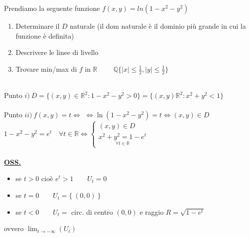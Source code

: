 \documentclass[a4paper, oneside]{article}
\begin{document}
                \begin{example}
                    Prendiamo la seguente funzione
                    $f(x,y) = ln(1-x^2-y^2)$
            \begin{enumerate}[$i)$]
                \item Determinare il $D$ naturale (il dom naturale è il dominio più grande in cui la funzione è definita)
                \item Descrivere le linee di livello
                \item Trovare min/max di $f$ in $\mathbb{R}$ $\qquad \mathbb{Q} \{ |x| \leq \frac{1}{2} , |y| \leq  \frac{1}{2}\}$
            \end{enumerate}

            \hfil\\
            Punto $i) \ D=\{(x,y) \in \mathbb{R}^2: 1-x^2-y^2 >0\} = \{(x,y) \mathbb{R}^2: x^2+y^2<1\}$\\
            \hfil\\
            Punto $ii) \ f(x,y) = t \Leftrightarrow$  $\Leftrightarrow \ln(1-x^2-y^2) = t \Leftrightarrow (x,y) \in D$\\
            $1-x^2-y^2 = e^t \quad \forall t \in \mathbb{R} \Leftrightarrow
            \begin{cases}
                (x,y) \in D\\
                \underset{\forall t \in \mathbb{R}}{x^2+y^2=1-e^t}
            \end{cases}$\\
            \hfil\\
            \underline{\textbf{OSS.}}
            \begin{itemize}
                \item  se $t>0$ cioè $e^t > 1 \qquad U_t = 0$
                \item  se $t=0 \qquad U_t = \{ \ (0,0) \ \}$
                \item se $t<0 \qquad U_t =$ circ. di centro $(0,0)$ e raggio $R=\sqrt{1-e^t}$
            \end{itemize}
            ovvero $\lim_{t \to -\infty}(U_t) $
            \end{example}
            
\end{document}
